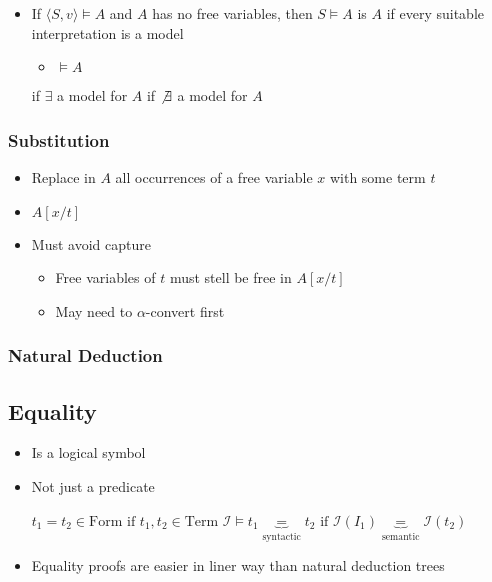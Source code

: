 \begin{itemize}
\begin{itemize}
\begin{itemize}
                \end{itemize}
        \end{itemize}
    \item If $\langle S, v \rangle \models A$ and $A$ has no free variables, then $S \models A$
     is $A$ if every suitable interpretation is a model
        \begin{itemize}
            \item $\models A$
        \end{itemize}
     if $\exists$ a model for $A$
     if $\not\exists$ a model for $A$
\end{itemize}

\subsubsection{Substitution}
\begin{itemize}
    \item Replace in $A$ all occurrences of a free variable $x$ with some term $t$
    \item $A[x/t]$
    \item Must avoid capture
        \begin{itemize}
            \item Free variables of $t$ must stell be free in $A[x/t]$
            \item May need to $\alpha$-convert first
        \end{itemize}
\end{itemize}

\subsubsection{Natural Deduction}

\subsection{Equality}
\begin{itemize}
    \item Is a logical symbol
    \item Not just a predicate
        \begin{itemize}
             $t_1 = t_2 \in \text{Form if } t_1, t_2 \in \text{Term}$
             $\mathcal{I} \models t_1 \underbrace{=}_{\text{syntactic}} t_2 \text{ if } \mathcal{I}(I_1) \underbrace{=}_{\text{semantic}} \mathcal{I}(t_2)$
        \end{itemize}
    \item Equality proofs are easier in liner way than natural deduction trees
\end{itemize}

